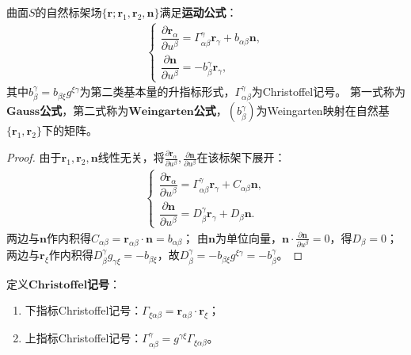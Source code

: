 \documentclass[../../main.tex]{subfiles}%
\begin{document}
\begin{theorem}
曲面$S$的自然标架场$\{\boldsymbol{r};\boldsymbol{r}_1,\boldsymbol{r}_2,\boldsymbol{n}\}$满足\textbf{运动公式}：
\begin{align}
\begin{cases}
\dfrac{\partial \boldsymbol{r}_\alpha}{\partial u^\beta}=\Gamma^\gamma_{\alpha\beta}\boldsymbol{r}_\gamma+b_{\alpha\beta}\boldsymbol{n},\\
\dfrac{\partial \boldsymbol{n}}{\partial u^\beta}=-b^\gamma_\beta\boldsymbol{r}_\gamma,
\end{cases}\label{eq:frame_motion}
\end{align}
其中$b^\gamma_\beta=b_{\beta\xi}g^{\xi\gamma}$为第二类基本量的升指标形式，$\Gamma^\gamma_{\alpha\beta}$为Christoffel记号。
第一式称为$\mathbf{Gauss}$\textbf{公式}，第二式称为$\mathbf{Weingarten}$\textbf{公式}，$(b^\gamma_\beta)$为Weingarten映射在自然基$\{\boldsymbol{r}_1,\boldsymbol{r}_2\}$下的矩阵。
\end{theorem}
\begin{proof}
由于$\boldsymbol{r}_1,\boldsymbol{r}_2,\boldsymbol{n}$线性无关，将$\frac{\partial \boldsymbol{r}_\alpha}{\partial u^\beta},\frac{\partial \boldsymbol{n}}{\partial u^\beta}$在该标架下展开：
\begin{align*}
\begin{cases}
\dfrac{\partial \boldsymbol{r}_\alpha}{\partial u^\beta}=\Gamma^\gamma_{\alpha\beta}\boldsymbol{r}_\gamma+C_{\alpha\beta}\boldsymbol{n},\\
\dfrac{\partial \boldsymbol{n}}{\partial u^\beta}=D^\gamma_\beta\boldsymbol{r}_\gamma+D_\beta\boldsymbol{n}.
\end{cases}
\end{align*}
两边与$\boldsymbol{n}$作内积得$C_{\alpha\beta}=\boldsymbol{r}_{\alpha\beta}\cdot\boldsymbol{n}=b_{\alpha\beta}$；
由$\boldsymbol{n}$为单位向量，$\boldsymbol{n}\cdot\frac{\partial \boldsymbol{n}}{\partial u^\beta}=0$，得$D_\beta=0$；
两边与$\boldsymbol{r}_\xi$作内积得$D^\gamma_\beta g_{\gamma\xi}=-b_{\beta\xi}$，故$D^\gamma_\beta=-b_{\beta\xi}g^{\xi\gamma}=-b^\gamma_\beta$。
\end{proof}

\begin{definition}
定义$\mathbf{Christoffel}$\textbf{记号}：
\begin{enumerate}[(1)]
\item 下指标Christoffel记号：$\Gamma_{\xi\alpha\beta}=\boldsymbol{r}_{\alpha\beta}\cdot\boldsymbol{r}_\xi$；
\item 上指标Christoffel记号：$\Gamma^\gamma_{\alpha\beta}=g^{\gamma\xi}\Gamma_{\xi\alpha\beta}$。
\end{enumerate}
\end{definition}
\end{document}
